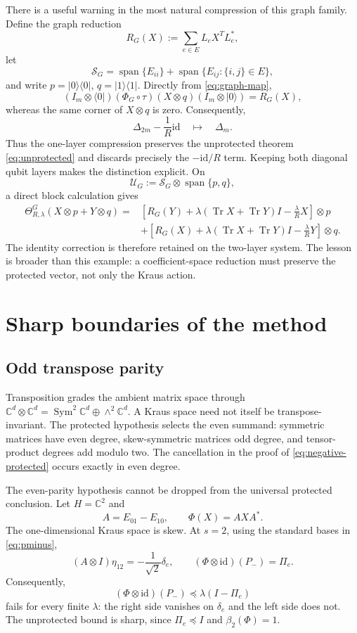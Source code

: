 \documentclass[11pt,reqno]{amsart}
\theoremstyle{remark}
\DeclareMathOperator{\Tr}{Tr}
\newcommand{\id}{\mathrm{id}}
\newcommand{\C}{\mathbb C}
\newcommand{\ketbra}[2]{\lvert #1\rangle\!\langle #2\rvert}
\newcommand{\preceqop}{\mathrel{\preceq}}
\begin{document}
There is a useful warning in the most natural compression of this graph
family.  Define the graph reduction
\[
  R_G(X):=\sum_{e\in E}L_eX^TL_e^*,
\]
let
\[
  \mathcal S_G=\operatorname{span}\{E_{ii}\}
  +\operatorname{span}\{E_{ij}:\{i,j\}\in E\},
\]
and write $p=\ketbra00$, $q=\ketbra11$.  Directly from
\cref{eq:graph-map},
\[
  (I_m\otimes\langle0\rvert)(\Phi_G\circ\tau)(X\otimes q)
       (I_m\otimes\lvert0\rangle)=R_G(X),
\]
whereas the same corner of $X\otimes q$ is zero.  Consequently,
\[
  \Delta_{2m}-\frac1R\id\quad\longmapsto\quad\Delta_m.
\]
Thus the one-layer compression preserves the unprotected theorem
\cref{eq:unprotected} and discards precisely the $-\id/R$ term.  Keeping both
diagonal qubit layers makes the distinction explicit.  On
\[
  \mathcal U_G:=\mathcal S_G\otimes\operatorname{span}\{p,q\},
\]
a direct block calculation gives
\begin{align*}
 \Theta^G_{R,\lambda}(X\otimes p+Y\otimes q)
  ={}&\left[R_G(Y)+\lambda(\Tr X+\Tr Y)I-\frac{\lambda}{R}X\right]\otimes p\\
   &+\left[R_G(X)+\lambda(\Tr X+\Tr Y)I-\frac{\lambda}{R}Y\right]\otimes q.
\end{align*}
The identity correction is therefore retained on the two-layer system.  The
lesson is broader than this example: a coefficient-space reduction must
preserve the protected vector, not only the Kraus action.

\section{Sharp boundaries of the method}
\label{sec:limits}

\subsection{Odd transpose parity}

Transposition grades the ambient matrix space through
$\C^d\otimes\C^d=\operatorname{Sym}^2\C^d\oplus\wedge^2\C^d$.
A Kraus space need not itself be transpose-invariant.  The protected
hypothesis selects the even summand: symmetric matrices have even degree,
skew-symmetric matrices odd degree, and tensor-product degrees add modulo
two.  The cancellation in the proof of
\cref{eq:negative-protected} occurs exactly in even degree.

The even-parity hypothesis cannot be dropped from the universal protected
conclusion.
Let $H=\C^2$ and
\[
  A=E_{01}-E_{10},\qquad \Phi(X)=AXA^*.
\]
The one-dimensional Kraus space is skew.  At $s=2$, using the standard
bases in \cref{eq:pminus},
\[
  (A\otimes I)\eta_{12}=-\frac1{\sqrt2}\delta_e,
  \qquad
  (\Phi\otimes\id)(P_-)=\Pi_e.
\]
Consequently,
\[
  (\Phi\otimes\id)(P_-)
  \preceqop\lambda(I-\Pi_e)
\]
fails for every finite $\lambda$: the right side vanishes on
$\delta_e$ and the left side does not.  The unprotected bound is sharp,
since $\Pi_e\preceqop I$ and $\beta_2(\Phi)=1$.
\end{document}
